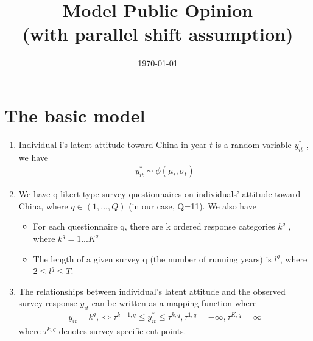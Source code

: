 \documentclass{article}
\title{Model Public Opinion \\
       (with parallel shift assumption)}
\date{\today}
\begin{document}
\maketitle

\section{The basic model}
\begin{enumerate}
    \item Individual i's latent attitude toward China in  year $t$ is a random variable  $y^*_{it}$ , we have
    \begin{align}
     y^*_{it}   \sim \phi(\mu_t ,\sigma_t)  
    \end{align}
    
    
    
    \item We have q likert-type survey questionnaires on individuals’ attitude toward China,  where  $q \in (1,..., Q)$ (in our case, Q=11). We also have 
    \begin{itemize}
    \item For each questionnaire q, there are k ordered response categories $k^q$ , where $k^q=1...K^q$
    \item  The length of a given survey q (the number of running years) is $l^q$, where $ 2 \leq l^q \leq T$.
      \end{itemize}  
      
    \item The relationships between individual's latent attitude and the observed survey response $y_{it}$ can be written as a mapping function where
    \begin{align}\label{eq3}
       y_{it} = k^{q}, \Leftrightarrow	 \tau^{k-1,q} \leq  y^*_{it}  \leq \tau^{k,q}, \tau^{1,q} = - \infty,  \tau^{K,q} = \infty
    \end{align}
      where  $\tau^{k,q}$ denotes survey-specific cut points. 
  \end{enumerate}
  
\end{document}

